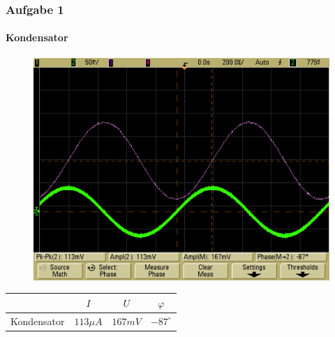 \begin{frame}
\frametitle{Aufgabe 1}
\framesubtitle{Kondensator}
\begin{figure}[H]
    \begin{center}
                \includegraphics[scale=0.15]{./img/1a_Kondensator_1.png}
    \end{center}
\end{figure}
\begin{center}
\begin{tabular}{c|| c | c | c}
    & $I$ & $U$ & $\varphi$ \\
    \hline
    Kondensator & $113 \mu A$ & $167mV$ & $-87^{\circ}$ \\
\end{tabular}
\end{center}
\end{frame}

